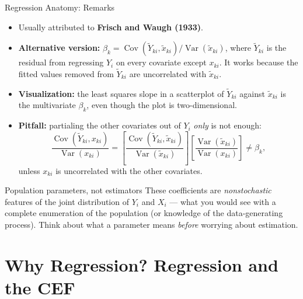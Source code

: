 \documentclass[aspectratio=169,11pt]{beamer}
\newcommand{\Var}{\operatorname{Var}}
\newcommand{\Cov}{\operatorname{Cov}}
\begin{document}
\begin{frame}{Regression Anatomy: Remarks}
\small

\begin{itemize}
    \item Usually attributed to \textbf{Frisch and Waugh (1933)}.
    \item \textbf{Alternative version:}
    $\beta_k = \Cov(\tilde Y_{ki},\tilde x_{ki})/\Var(\tilde x_{ki})$, where
    $\tilde Y_{ki}$ is the residual from regressing $Y_i$ on every covariate
    except $x_{ki}$. It works because the fitted values removed from
    $\tilde Y_{ki}$ are uncorrelated with $\tilde x_{ki}$.
    \item \textbf{Visualization:} the least squares slope in a scatterplot of
    $\tilde Y_{ki}$ against $\tilde x_{ki}$ is the multivariate $\beta_k$,
    even though the plot is two-dimensional.
    \item \textbf{Pitfall:} partialing the other covariates out of $Y_i$
    \emph{only} is not enough:
    \[
    \frac{\Cov(\tilde Y_{ki},x_{ki})}{\Var(x_{ki})}
    = \left[\frac{\Cov(\tilde Y_{ki},\tilde x_{ki})}{\Var(\tilde x_{ki})}\right]
      \left[\frac{\Var(\tilde x_{ki})}{\Var(x_{ki})}\right]
    \neq \beta_k,
    \]
    unless $x_{ki}$ is uncorrelated with the other covariates.
\end{itemize}

\begin{block}{Population parameters, not estimators}
These coefficients are \emph{nonstochastic} features of the joint
distribution of $Y_i$ and $X_i$ --- what you would see with a complete
enumeration of the population (or knowledge of the data-generating process).
Think about what a parameter means \emph{before} worrying about estimation.
\end{block}

\end{frame}



\section{Why Regression? Regression and the CEF}
\end{document}
